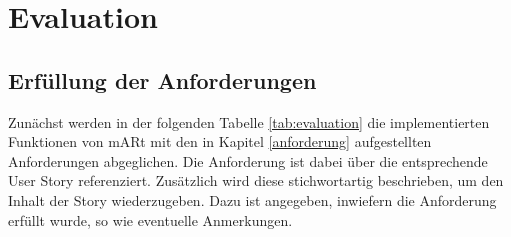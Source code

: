 

\chapter{Evaluation}
\label{evaluation}

\section{Erfüllung der Anforderungen}

Zunächst werden in der folgenden Tabelle \ref{tab:evaluation} die implementierten Funktionen von mARt mit den in Kapitel \ref{anforderung} aufgestellten Anforderungen abgeglichen. Die Anforderung ist dabei über die entsprechende User Story referenziert. Zusätzlich wird diese stichwortartig beschrieben, um den Inhalt der Story wiederzugeben. Dazu ist angegeben, inwiefern die Anforderung erfüllt wurde, so wie eventuelle Anmerkungen. 

